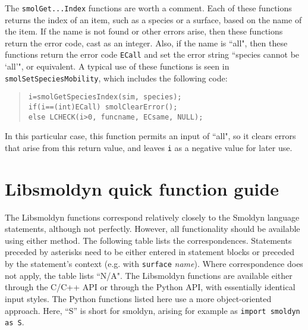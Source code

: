 \documentclass {book}
\newcommand {\ttt} {\texttt}
\begin{document}
The \ttt{smolGet...Index} functions are worth a comment. Each of these functions returns the index of an item, such as a species or a surface, based on the name of the item. If the name is not found or other errors arise, then these functions return the error code, cast as an integer. Also, if the name is ``all", then these functions return the error code \ttt{ECall} and set the error string ``species cannot be `all'", or equivalent. A typical use of these functions is seen in \ttt{smolSetSpeciesMobility}, which includes the following code:

\begin{quote}
\begin{lstlisting}
i=smolGetSpeciesIndex(sim, species);
if(i==(int)ECall) smolClearError();
else LCHECK(i>0, funcname, ECsame, NULL);
\end{lstlisting}
\end{quote}

In this particular case, this function permits an input of ``all", so it clears errors that arise from this return value, and leaves \ttt{i} as a negative value for later use.


\chapter{Libsmoldyn quick function guide}

The Libsmoldyn functions correspond relatively closely to the Smoldyn language statements, although not perfectly. However, all functionality should be available using either method. The following table lists the correspondences. Statements preceded by asterisks need to be either entered in statement blocks or preceded by the statement's context (e.g. with \ttt{surface} \emph{name}). Where correspondence does not apply, the table lists ``N/A". The Libsmoldyn functions are available either through the C/C++ API or through the Python API, with essentially identical input styles. The Python functions listed here use a more object-oriented approach. Here, ``S'' is short for smoldyn, arising for example as \ttt{import smoldyn as S}.
\end{document}
